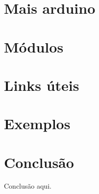 \documentclass{article}
\begin{document}
\section{Mais arduino}

\section{Módulos}

\section{Links úteis}
%

\section{Exemplos}



\section{Conclusão}
Conclusão aqui.
\end{document}
